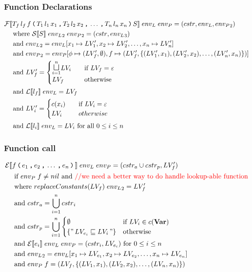 \subsubsection{Function Declarations}
\begin{align*}
& \iF\dblSq{T_f \, l_f \, f \tk ( T_1 \, l_1 \, x_1 \tk , T_2 \, l_2 \, x_2 \tk , \dots \tk , T_n \, l_n \, x_n \tk ) S} \; \ienvL \; \ienvP
  =  (\icstr, \ienvL, \ienvP_2) \\
& \dsWhere{\iS\dblSq{S} \; \ienvL_2 \; \ienvP_2 = (\icstr, \ienvL_3)} \\
& \dsAnd{\ienvL_2 = \ienvL[x_1 \mapsto \iLV_1', x_2 \mapsto \iLV_2', \dots, x_n \mapsto \iLV_n']} \\
& \dsAnd{\ienvP_2 = \ienvP[\ifb \mapsto (\iLV_f', \emptyset), f \mapsto (\iLV_f', \{(\iLV_1', x_1), (\iLV_2', x_2), \dots, (\iLV_n', x_n)\})]} \\
& \dsAnd{\iLV_f' = \begin{cases}
    \mathlarger\sqcupl_{i = 1}^n \iLV_i & \quad \text{if } \iLV_f = \varepsilon \\
    \iLV_f & \quad \text{otherwise}
  \end{cases}} \\
& \dsAnd{\iL\dblSq{l_f} \; \ienvL = \iLV_f} \\
& \dsAnd{\iLV_i' = \begin{cases}
    c(x_i) & \quad \text{if } \iLV_i = \varepsilon \\
    \iLV_i & \quad otherwise
  \end{cases}} \\
& \dsAnd{\iL\dblSq{l_i} \; \ienvL = \iLV_i \text{ for all } 0 \leq i \leq n}
\end{align*}

\subsubsection{Function call}
\begin{align*}
& \mathcal{E}[\![ f \, \texttt{(} \, e_1 \, \texttt{,} \, e_2 \, \texttt{,} \, \dots \, \texttt{,} \, e_n \, \texttt{)} \, ]\!] \; {env_L} \; {env_P} = (cstr_a \cup cstr_p, LV_f') \\
& \quad \text{ if } {env_P} \; f \not = nil \text{ and} \text{\color{red}{ //we need a better way to do handle lookup-able function}} \\
& \quad \text{ where } replaceConstants(LV_f) \; {env_L}_2 = LV_f' \\
& \quad \text{ and } {cstr}_a = \bigcup\limits_{i=1}^n {cstr}_i \\
& \quad \text{ and } {cstr}_p = \bigcup\limits_{i=1}^n
  \begin{cases}
    \emptyset &\text{if } LV_i \in c(\mathbf{Var})\\
    \{ "\,LV_{e_i} \sqsubseteq LV_i\," \} & \text{otherwise}
  \end{cases} \\
& \quad \text{ and } \mathcal{E}[\![ e_i ]\!] \; {env_L} \; {env_P} = (cstr_i, LV_{e_i}) \text{ for } 0 \leq i \leq n \\
& \quad \text{ and } {env_L}_2 = {env_L}[x_1 \mapsto LV_{e_1}, x_2 \mapsto LV_{e_2}, \dots, x_n \mapsto LV_{e_n}] \\
& \quad \text{ and } {env_P} \; f = (LV_f, \{(LV_1, x_1), (LV_2, x_2), \dots, (LV_n, x_n)\})
\end{align*}

